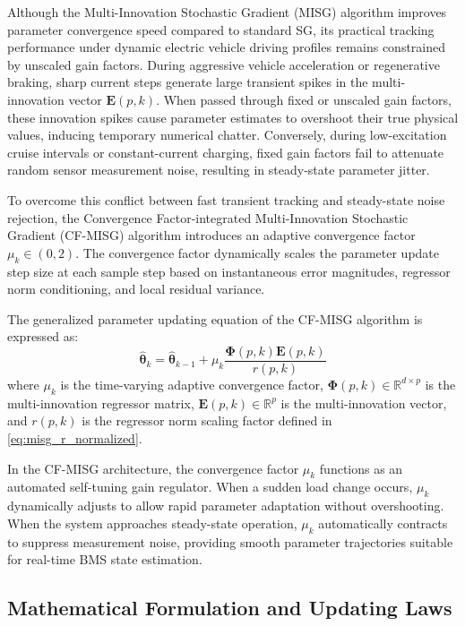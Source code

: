 Although the Multi-Innovation Stochastic Gradient (MISG) algorithm improves parameter convergence speed compared to standard SG, its practical tracking performance under dynamic electric vehicle driving profiles remains constrained by unscaled gain factors. During aggressive vehicle acceleration or regenerative braking, sharp current steps generate large transient spikes in the multi-innovation vector $\mathbf{E}(p, k)$. When passed through fixed or unscaled gain factors, these innovation spikes cause parameter estimates to overshoot their true physical values, inducing temporary numerical chatter. Conversely, during low-excitation cruise intervals or constant-current charging, fixed gain factors fail to attenuate random sensor measurement noise, resulting in steady-state parameter jitter.

To overcome this conflict between fast transient tracking and steady-state noise rejection, the Convergence Factor-integrated Multi-Innovation Stochastic Gradient (CF-MISG) algorithm introduces an adaptive convergence factor $\mu_k \in (0, 2)$. The convergence factor dynamically scales the parameter update step size at each sample step based on instantaneous error magnitudes, regressor norm conditioning, and local residual variance.

The generalized parameter updating equation of the CF-MISG algorithm is expressed as:
\begin{equation}
\hat{\boldsymbol{\theta}}_k = \hat{\boldsymbol{\theta}}_{k-1} + \mu_k \frac{\boldsymbol{\Phi}(p, k) \mathbf{E}(p, k)}{r(p, k)}
\label{eq:cf_misg_update_main}
\end{equation}
where $\mu_k$ is the time-varying adaptive convergence factor, $\boldsymbol{\Phi}(p, k) \in \mathbb{R}^{d \times p}$ is the multi-innovation regressor matrix, $\mathbf{E}(p, k) \in \mathbb{R}^p$ is the multi-innovation vector, and $r(p, k)$ is the regressor norm scaling factor defined in \eqref{eq:misg_r_normalized}.

In the CF-MISG architecture, the convergence factor $\mu_k$ functions as an automated self-tuning gain regulator. When a sudden load change occurs, $\mu_k$ dynamically adjusts to allow rapid parameter adaptation without overshooting. When the system approaches steady-state operation, $\mu_k$ automatically contracts to suppress measurement noise, providing smooth parameter trajectories suitable for real-time BMS state estimation.


\subsection{Mathematical Formulation and Updating Laws}
\label{subsec:cf_misg_math}

